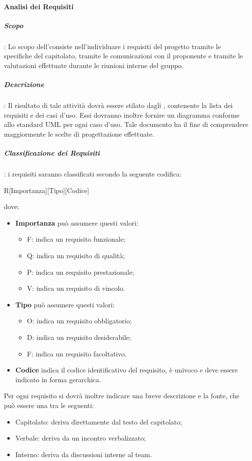\paragraph{Analisi dei Requisiti}
\subparagraph{Scopo}:
	Lo scopo dell'\AdR consiste nell'individuare i requisiti del progetto tramite le specifiche del capitolato, tramite le comunicazioni con il proponente e tramite le valutazioni effettuate durante le riunioni interne del gruppo. 
\subparagraph{Descrizione}:
	Il risultato di tale attività dovrà essere stilato dagli \anas, contenente la lista dei requisiti e dei casi d'uso. Essi dovranno inoltre fornire un diagramma conforme
	allo standard UML per ogni caso d’uso. Tale documento ha il fine di comprendere maggiormente le scelte di progettazione effettuate.
\subparagraph{Classificazione dei Requisiti}:
	i requisiti saranno classificati secondo la seguente codifica:
		\begin{center}
			R[Importanza][Tipo][Codice]
		\end{center}
	dove:
	\begin{itemize}
		\item \textbf{Importanza} può assumere questi valori:
			\begin{itemize}
				\item F: indica un requisito funzionale;
				\item Q: indica un requisito di qualità;
				\item P: indica un requisito prestazionale;
				\item V: indica un requisito di vincolo.
			\end{itemize}
		\item \textbf{Tipo} può assumere questi valori:
			\begin{itemize}
				\item O: indica un requisito obbligatorio;
				\item D: indica un requisito desiderabile;
				\item F: indica un requisito facoltativo.
			\end{itemize}
		\item \textbf{Codice} indica il codice identificativo del requisito, è univoco e deve essere indicato in
		forma gerarchica.
	\end{itemize}
	Per ogni requisito si dovrà inoltre indicare una breve descrizione e la fonte, che può essere una tra le seguenti:
		\begin{itemize}
		\item Capitolato: deriva direttamente dal testo del capitolato;
		\item Verbale: deriva da un incontro verbalizzato;
		\item Interno: deriva da discussioni interne al team.
		\end{itemize}
	

